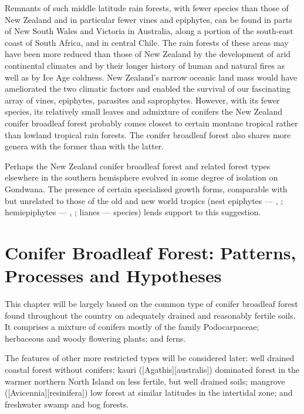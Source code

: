 Remnants of such middle latitude rain forests, with fewer species than those of New Zealand and in particular fewer vines and epiphytes, can be found in parts of New South Wales and Victoria in Australia, along a portion of the south-east coast of South Africa, and in central Chile.
The rain forests of these areas may have been more reduced than those of New Zealand by the development of arid continental climates and by their longer history of human and natural fires as well as by Ice Age coldness.
New Zealand's narrow oceanic land mass would have ameliorated the two climatic factors and enabled the survival of our fascinating array of vines, epiphytes, parasites and saprophytes.
However, with its fewer species, its relatively small leaves and admixture of conifers the New Zealand conifer broadleaf forest probably comes closest to certain montane tropical rather than lowland tropical rain forests.
The conifer broadleaf forest also shares more genera with the former than with the latter.

Perhaps the New Zealand conifer broadleaf forest and related forest types elsewhere in the southern hemisphere evolved in some degree of isolation on Gondwana.
The presence of certain specialised growth forms, comparable with but unrelated to those of the old and new world tropics (nest epiphytes --- , ; hemiepiphytes --- , ; lianes ---  species) lends support to this suggestion.

\chapter{Conifer Broadleaf Forest: Patterns, Processes and Hypotheses}

This chapter will be largely based on the common type of conifer broadleaf forest found throughout the country on adequately drained and reasonably fertile soils.
It comprises a mixture of conifers mostly of the family Podocarpaceae; herbaceous and woody flowering plants; and ferns.

The features of other more restricted types will be considered later: well drained coastal forest without conifers; kauri ([Agathis][australis]) dominated forest in the warmer northern North Island on less fertile, but well drained soils; mangrove ([Avicennia][resinifera]) low forest at similar latitudes in the intertidal zone; and freshwater swamp and bog forests.


